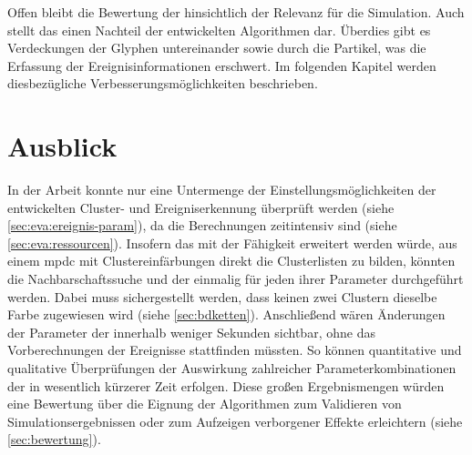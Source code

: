 Offen bleibt die Bewertung der  hinsichtlich der Relevanz für die Simulation. Auch stellt das  einen Nachteil der entwickelten Algorithmen dar.
Überdies gibt es Verdeckungen der Glyphen untereinander sowie durch die Partikel, was die Erfassung der Ereignisinformationen erschwert. Im folgenden Kapitel werden diesbezügliche Verbesserungsmöglichkeiten beschrieben.


\chapter{Ausblick}\label{sec:ausblick}
In der Arbeit konnte nur eine Untermenge der Einstellungsmöglichkeiten der entwickelten Cluster- und Ereigniserkennung überprüft werden (siehe \autoref{sec:eva:ereignis-param}), da die Berechnungen zeitintensiv sind (siehe \autoref{sec:eva:ressourcen}). Insofern das \SECalc mit der Fähigkeit erweitert werden würde, aus einem \gls{mpdc} mit Clustereinfärbungen direkt die Clusterlisten zu bilden, könnten die Nachbarschaftssuche und der \CFD einmalig für jeden ihrer Parameter durchgeführt werden. Dabei muss sichergestellt werden, dass keinen zwei Clustern dieselbe Farbe zugewiesen wird (siehe \autoref{sec:bdketten}). Anschließend wären Änderungen der Parameter der  innerhalb weniger Sekunden sichtbar, ohne das Vorberechnungen der Ereignisse stattfinden müssten. So können quantitative und qualitative Überprüfungen der Auswirkung zahlreicher Parameterkombinationen der  in wesentlich kürzerer Zeit erfolgen. Diese großen Ergebnismengen würden eine Bewertung über die Eignung der Algorithmen zum Validieren von Simulationsergebnissen oder zum Aufzeigen verborgener Effekte erleichtern (siehe \autoref{sec:bewertung}).

